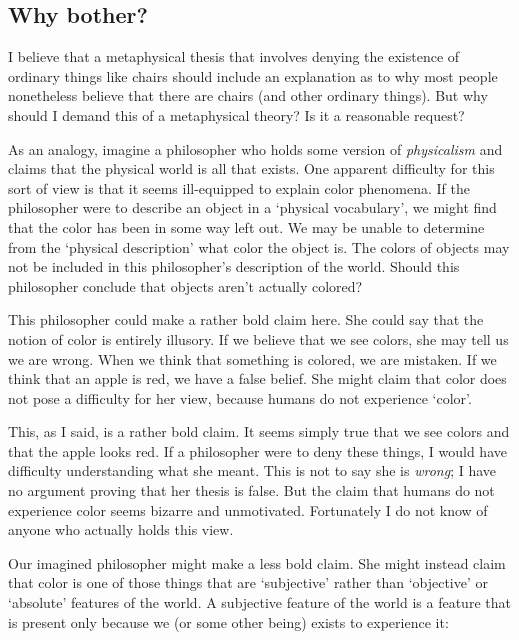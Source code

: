 \documentclass[11pt]{standalone}
\begin{document}
\begin{spacing}{1.5}
\subsection{Why bother?}
I believe that a metaphysical thesis that involves denying the
existence of ordinary things like chairs should include an explanation
as to why most people nonetheless believe that there are chairs (and
other ordinary things).  But why should I demand this of a
metaphysical theory?  Is it a reasonable request?

As an analogy, imagine a philosopher who holds some version of {\em
  physicalism} and claims that the physical world is all that exists.
One apparent difficulty for this sort of view is that it seems
ill-equipped to explain color phenomena.  If the philosopher were to
describe an object in a `physical vocabulary', we might find that the
color has been in some way left out.  We may be unable to determine
from the `physical description' what color the object is.  The colors
of objects may not be included in this philosopher's description of
the world.  Should this philosopher conclude that objects aren't
actually colored?

This philosopher could make a rather bold claim here.  She could say
that the notion of color is entirely illusory.  If we believe that we
see colors, she may tell us we are wrong.  When we think that
something is colored, we are mistaken.  If we think that an apple is
red, we have a false belief.  She might claim that color does not pose
a difficulty for her view, because humans do not experience `color'.

This, as I said, is a rather bold claim.  It seems simply true that we
see colors and that the apple looks red.  If a philosopher were to
deny these things, I would have difficulty understanding what she
meant.  This is not to say she is {\em wrong}; I have no argument
proving that her thesis is false.  But the claim that humans do not
experience color seems bizarre and unmotivated.  Fortunately I do not
know of anyone who actually holds this view.

Our imagined philosopher might make a less bold claim.  She might
instead claim that color is one of those things that are `subjective'
rather than `objective' or `absolute' features of the world.  A
subjective feature of the world is a feature that is present only
because we (or some other being) exists to experience it:


\end{spacing}
\end{document}
